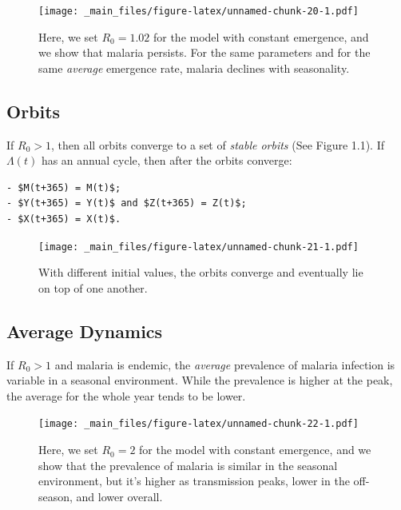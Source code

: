 \documentclass[
]{book}
\begin{document}
\begin{figure}
\centering
\texttt{[image: \_main\_files/figure-latex/unnamed-chunk-20-1.pdf]}
\caption{\label{fig:unnamed-chunk-20}Here, we set \(R_0= 1.02\) for the model with constant emergence, and we show that malaria persists. For the same parameters and for the same \emph{average} emergence rate, malaria declines with seasonality.}
\end{figure}

\clearpage

\hypertarget{orbits}{%
\subsection{Orbits}\label{orbits}}

If \(R_0 >1\), then all orbits converge to a set of \emph{stable orbits} (See Figure 1.1). If \(\Lambda(t)\) has an annual cycle, then after the orbits converge:

\begin{verbatim}
- $M(t+365) = M(t)$; 
- $Y(t+365) = Y(t)$ and $Z(t+365) = Z(t)$; 
- $X(t+365) = X(t)$. 
\end{verbatim}

\begin{figure}
\centering
\texttt{[image: \_main\_files/figure-latex/unnamed-chunk-21-1.pdf]}
\caption{\label{fig:unnamed-chunk-21}With different initial values, the orbits converge and eventually lie on top of one another.}
\end{figure}

\clearpage

\hypertarget{average-dynamics}{%
\subsection{Average Dynamics}\label{average-dynamics}}

If \(R_0>1\) and malaria is endemic, the \emph{average} prevalence of malaria infection is variable in a seasonal environment. While the prevalence is higher at the peak, the average for the whole year tends to be lower.

\begin{figure}
\centering
\texttt{[image: \_main\_files/figure-latex/unnamed-chunk-22-1.pdf]}
\caption{\label{fig:unnamed-chunk-22}Here, we set \(R_0= 2\) for the model with constant emergence, and we show that the prevalence of malaria is similar in the seasonal environment, but it's higher as transmission peaks, lower in the off-season, and lower overall.}
\end{figure}
\end{document}
